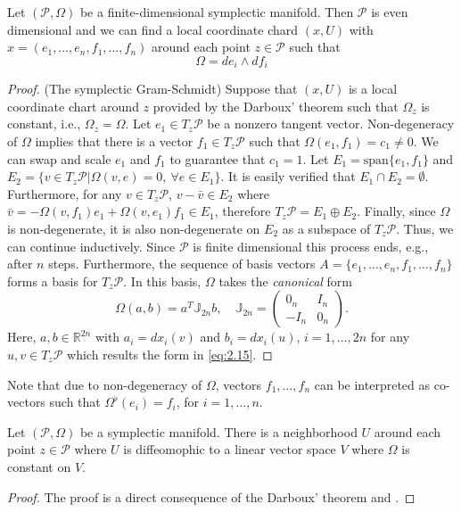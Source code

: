 \begin{corollary} \label{theorem:2.7}
Let $(\mathcal P, \Omega)$ be a finite-dimensional symplectic manifold. Then $\mathcal P$ is even dimensional and we can find a local coordinate chard $(x,U)$ with $x=(e_1,\dots,e_n,f_1,\dots,f_n)$ around each point $z\in \mathcal P$ such that
\begin{equation} \label{eq:2.15}
	\Omega = de_i\wedge df_i
\end{equation}
\end{corollary}
\begin{proof}
(The symplectic Gram-Schmidt) Suppose that $(x,U)$ is a local coordinate chart around $z$ provided by the Darboux' theorem such that $\Omega_z$ is constant, i.e., $\Omega_z = \Omega$. Let $e_1\in T_z\mathcal P$ be a nonzero tangent vector. Non-degeneracy of $\Omega$ implies that there is a vector $f_1\in T_z\mathcal P$ such that $\Omega(e_1,f_1) = c_1 \neq 0$. We can swap and scale $e_1$ and $f_1$ to guarantee that $c_1 = 1$. Let $E_1 = \text{span}\{e_1,f_1\}$ and $E_2 = \{v\in T_z\mathcal P | \Omega(v,e) = 0,~ \forall e \in E_1\}$. It is easily verified that $E_1\cap E_2 = \emptyset$. Furthermore, for any $v\in T_z\mathcal P$, $v - \bar v \in E_2$ where $\bar v = -\Omega(v,f_1)e_1 + \Omega(v,e_1)f_1 \in E_1$, therefore $T_z\mathcal P = E_1 \oplus E_2$. Finally, since $\Omega$ is non-degenerate, it is also non-degenerate on $E_2$ as a subspace of $T_z\mathcal P$. Thus, we can continue inductively. Since $\mathcal P$ is finite dimensional this process ends, e.g., after $n$ steps. Furthermore, the sequence of basis vectors $A = \{ e_1,\dots,e_n,f_1,\dots,f_n\}$ forms a basis for $T_z\mathcal P$. In this basis, $\Omega$ takes the \emph{canonical} form
\begin{equation} \label{eq:2.141}
	\Omega( a, b) = a^T\mathbb J_{2n}b, \quad \mathbb J_{2n} =
	\begin{pmatrix}
		0_n & I_n \\
		-I_n & 0_n
	\end{pmatrix}.
\end{equation}
Here, $a,b\in \mathbb R^{2n}$ with $a_i = dx_i(v)$ and $b_i = dx_i(u)$, $i=1,\dots,2n$ for any $u,v \in T_z\mathcal P$ which results the form in \cref{eq:2.15}.
\end{proof}

Note that due to non-degeneracy of $\Omega$, vectors $f_1,\dots,f_n$ can be interpreted as co-vectors such that $\Omega^{\flat}(e_i)=f_i$, for $i=1,\dots,n$.  

\begin{corollary} \label{theorem:2.8}
Let $(\mathcal P, \Omega)$ be a symplectic manifold. There is a neighborhood $U$ around each point $z\in \mathcal P$ where $U$ is diffeomophic to a linear vector space $V$ where $\Omega$ is constant on $V$.
\end{corollary}
\begin{proof}
The proof is a direct consequence of the Darboux' theorem and .
\end{proof}

